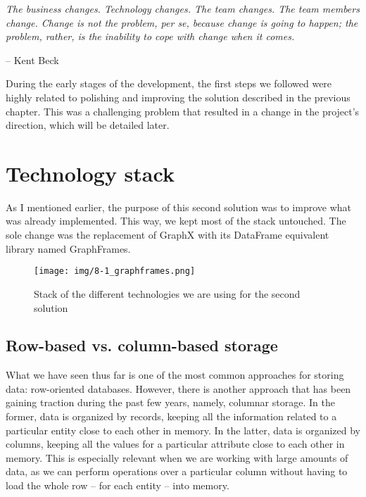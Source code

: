 \epigraph{\textit{The business changes. Technology changes. The team changes. The team members change. Change is not the problem, per se, because change is going to happen; the problem, rather, is the inability to cope with change when it comes.}}{-- \textup{Kent Beck}}

During the early stages of the development, the first steps we followed were highly related to polishing and improving the solution described in the previous chapter. This was a challenging problem that resulted in a change in the project's direction, which will be detailed later.

\section{Technology stack}

As I mentioned earlier, the purpose of this second solution was to improve what was already implemented. This way, we kept most of the stack untouched. The sole change was the replacement of GraphX with its DataFrame equivalent library named GraphFrames.

\begin{figure}[ht]
    \centering
    \texttt{[image: img/8-1\_graphframes.png]}
    \caption[Stack of the different technologies we are using for the second solution]{Stack of the different technologies we are using for the second solution\footnotemark}
\end{figure}


\subsection{Row-based vs. column-based storage}

What we have seen thus far is one of the most common approaches for storing data: row-oriented databases. However, there is another approach that has been gaining traction during the past few years, namely, columnar storage. In the former, data is organized by records, keeping all the information related to a particular entity close to each other in memory. In the latter, data is organized by columns, keeping all the values for a particular attribute close to each other in memory. This is especially relevant when we are working with large amounts of data, as we can perform operations over a particular column without having to load the whole row -- for each entity -- into memory.

